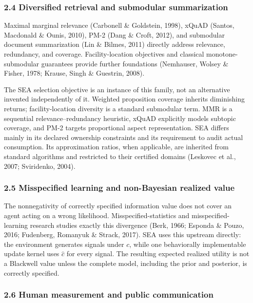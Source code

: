 \documentclass[
  11pt]{article}
\begin{document}
\subsubsection{2.4 Diversified retrieval and submodular
summarization}\label{diversified-retrieval-and-submodular-summarization}

Maximal marginal relevance (Carbonell \& Goldstein, 1998), xQuAD
(Santos, Macdonald \& Ounis, 2010), PM-2 (Dang \& Croft, 2012), and
submodular document summarization (Lin \& Bilmes, 2011) directly address
relevance, redundancy, and coverage. Facility-location objectives and
classical monotone-submodular guarantees provide further foundations
(Nemhauser, Wolsey \& Fisher, 1978; Krause, Singh \& Guestrin, 2008).

The SEA selection objective is an instance of this family, not an
alternative invented independently of it. Weighted proposition coverage
inherits diminishing returns; facility-location diversity is a standard
submodular term. MMR is a sequential relevance--redundancy heuristic,
xQuAD explicitly models subtopic coverage, and PM-2 targets proportional
aspect representation. SEA differs mainly in its declared ownership
constraints and its requirement to audit actual consumption. Its
approximation ratios, when applicable, are inherited from standard
algorithms and restricted to their certified domains (Leskovec et al.,
2007; Sviridenko, 2004).

\subsubsection{2.5 Misspecified learning and non-Bayesian realized
value}\label{misspecified-learning-and-non-bayesian-realized-value}

The nonnegativity of correctly specified information value does not
cover an agent acting on a wrong likelihood. Misspecified-statistics and
misspecified-learning research studies exactly this divergence (Berk,
1966; Esponda \& Pouzo, 2016; Fudenberg, Romanyuk \& Strack, 2017). SEA
uses this upstream directly: the environment generates signals under
\(c\), while one behaviorally implementable update kernel uses
\(\hat c\) for every signal. The resulting expected realized utility is
not a Blackwell value unless the complete model, including the prior and
posterior, is correctly specified.

\subsubsection{2.6 Human measurement and public
communication}\label{human-measurement-and-public-communication}
\end{document}
